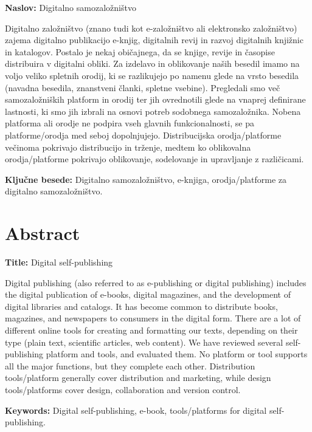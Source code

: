 \documentclass[a4paper, 12pt]{book}
\newcommand{\tkeywords}{Digitalno samozaložništvo, e-knjiga, orodja/platforme za digitalno samozaložništvo}
\newcommand{\tkeywordsEn}{Digital self-publishing, e-book, tools/platforms for digital self-publishing}
\newcommand{\clearemptydoublepage}{\newpage{\pagestyle{empty}\cleardoublepage}}
\begin{document}
\noindent\textbf{Naslov:} Digitalno samozaložništvo
\bigskip

\noindent Digitalno založništvo (znano tudi kot e-založništvo ali elektronsko založništvo) zajema digitalno publikacijo e-knjig, digitalnih revij in razvoj digitalnih knjiž\-nic in katalogov. Postalo je nekaj običajnega, da se knjige, revije in časopise distribuira v digitalni obliki. Za izdelavo in oblikovanje naših besedil imamo na voljo veliko spletnih orodij, ki se razlikujejo po namenu glede na vrsto besedila (navadna besedila, znanstveni članki, spletne vsebine). Pregledali smo več samozaložniških platform in orodij ter jih ovrednotili glede na vnaprej definirane lastnosti, ki smo jih izbrali na osnovi potreb sodobnega samozaložnika. Nobena platforma ali orodje ne podpira vseh glavnih funkcionalnosti, se pa platforme/orodja med seboj dopolnjujejo. Distribucijska orodja/platforme večinoma pokrivajo distribucijo in trženje, medtem ko oblikovalna orodja/platforme pokrivajo oblikovanje, sodelovanje in upravljanje z različicami.
\bigskip

\noindent\textbf{Ključne besede:} \tkeywords.
\clearemptydoublepage

\chapter*{Abstract}

\noindent\textbf{Title:} Digital self-publishing
\bigskip

\noindent Digital publishing (also referred to as e-publishing or digital publishing) includes the digital publication of e-books, digital magazines, and the development of digital libraries and catalogs. It has become common to distribute books, magazines, and newspapers to consumers in the digital form. There are a lot of different online tools for creating and formatting our texts, depending on their type (plain text, scientific articles, web content). We have reviewed several self-publishing platform and tools, and evaluated them. No platform or tool supports all the major functions, but they complete each other. Distribution tools/platform generally cover distribution and marketing, while design tools/platforms cover design, collaboration and version control.
\bigskip

\noindent\textbf{Keywords:} \tkeywordsEn.
\clearemptydoublepage
\end{document}
